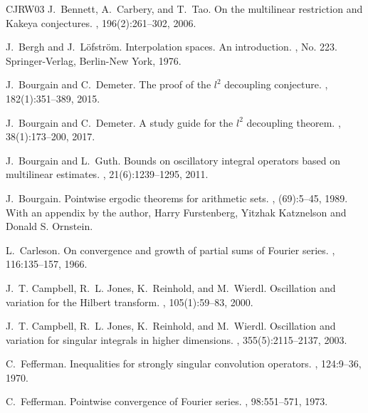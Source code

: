 \documentclass[12pt,leqno]{amsart}
\theoremstyle{plain}
\numberwithin{equation}{section}
\begin{document}
\newcommand{\etalchar}[1]{$^{#1}$}
\begin{thebibliography}{CJRW03}
	J.~Bennett, A.~Carbery, and T.~Tao.
	\newblock On the multilinear restriction and Kakeya conjectures.
	, 196(2):261--302, 2006.
	
	J.~Bergh and J.~L\"ofstr\"om.
	\newblock Interpolation spaces. An introduction.
    , No. 223. Springer-Verlag, Berlin-New York, 1976. 
	
	J.~Bourgain and C.~Demeter.
	\newblock The proof of the $l^2$ decoupling conjecture.
	, 182(1):351--389, 2015.
	
	J.~Bourgain and C.~Demeter.
	\newblock A study guide for the $l^2$ decoupling theorem.
	, 38(1):173--200, 2017.

	J.~Bourgain and L.~Guth.
	\newblock Bounds on oscillatory integral operators based on multilinear
              estimates.
	, 21(6):1239--1295, 2011.
	
	J.~Bourgain.
	\newblock Pointwise ergodic theorems for arithmetic sets.
	, (69):5--45, 1989.
	\newblock With an appendix by the author, Harry Furstenberg, Yitzhak Katznelson
	and Donald S. Ornstein.
	
	L.~Carleson.
	\newblock On convergence and growth of partial sums of {F}ourier series.
	, 116:135--157, 1966.
	
	J.~T. Campbell, R.~L. Jones, K.~Reinhold, and M.~Wierdl.
	\newblock Oscillation and variation for the {H}ilbert transform.
	, 105(1):59--83, 2000.
	
	J.~T. Campbell, R.~L. Jones, K.~Reinhold, and M.~Wierdl.
	\newblock Oscillation and variation for singular integrals in higher
	dimensions.
	, 355(5):2115--2137, 2003.

	C.~Fefferman.
	\newblock Inequalities for strongly singular convolution operators.
	, 124:9--36, 1970.
	
	C.~Fefferman.
	\newblock Pointwise convergence of {F}ourier series.
	, 98:551--571, 1973.
	

\end{thebibliography}
\end{document}
